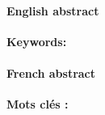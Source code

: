 
\clearpage

\paragraph{English abstract} %
\label{par:english_abstract}

\textbf{Keywords:}


\paragraph{French abstract} %
\label{par:french_abstract}

\textbf{Mots clés :}

